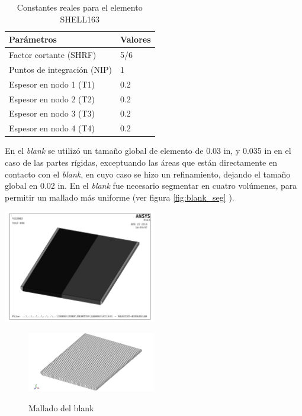 \begin{table}[h]
\centering
\caption{Constantes reales para el elemento SHELL163}
\label{}
\begin{tabular}{p{6cm} p{3cm}} \hline
Parámetros & Valores \\
\hline
Factor cortante (SHRF) & 5/6 \\
Puntos de integración (NIP) & 1 \\
Espesor en nodo 1 (T1) & 0.2 \\
Espesor en nodo 2 (T2) & 0.2 \\
Espesor en nodo 3 (T3) & 0.2 \\
Espesor en nodo 4 (T4) & 0.2 \\
\hline
\end{tabular}
\label{tab:shell_param}
\end{table}


En el \textit{blank} se utilizó un tamaño global de elemento de 0.03 in, y 0.035 in en el caso de las partes 
rígidas, exceptuando las áreas que están directamente en contacto con el \textit{blank}, en cuyo caso se hizo 
un refinamiento, dejando el tamaño global en 0.02 in. En el \textit{blank} fue necesario segmentar en cuatro 
volúmenes, para permitir un mallado más uniforme (ver figura \ref{fig:blank_seg} ).


\begin{center}
\includegraphics[width=0.5\textwidth]{src/ch3/blank_segmentado.pdf}
\label{fig:blank_seg}
\end{center}




\begin{figure}[!h]
\centering
\includegraphics[width=0.5\textwidth]{src/ch3/mesh_blank.png}
\label{fig:mesh_blank}
\caption{Mallado del blank}
\end{figure}



